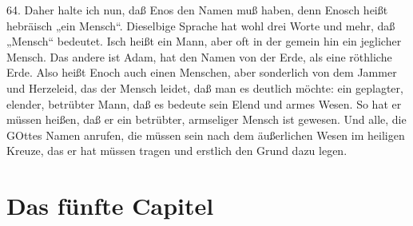 64. Daher halte ich nun, daß Enos den Namen muß haben, denn Enosch heißt hebräisch „ein Mensch“. Dieselbige Sprache hat wohl drei Worte und mehr, daß „Mensch“ bedeutet. Isch heißt ein Mann, aber oft in der gemein hin ein jeglicher Mensch. Das andere ist Adam,
hat den Namen von der Erde, als eine röthliche Erde. Also heißt Enoch auch einen Menschen, aber sonderlich von dem Jammer und Herzeleid, das der Mensch leidet, daß man es deutlich möchte: ein geplagter, elender, betrübter Mann, daß es bedeute sein Elend und armes Wesen. So hat er müssen heißen, daß er ein betrübter, armseliger Mensch ist gewesen. Und alle, die GOttes Namen anrufen, die müssen sein nach dem äußerlichen Wesen im heiligen Kreuze, das er hat müssen tragen und erstlich den Grund dazu legen.

\section{Das fünfte Capitel}

